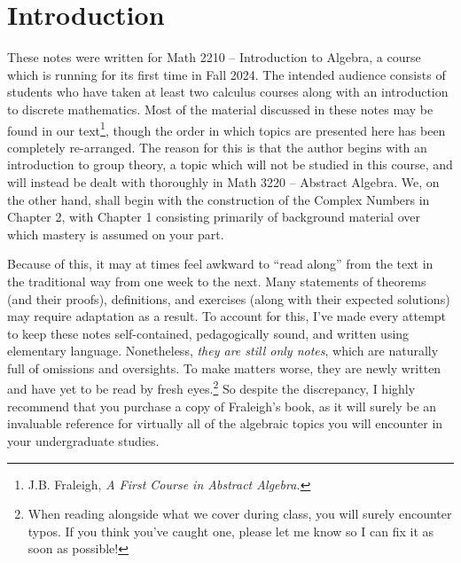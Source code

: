 \documentclass[11pt,fleqn,dvipsnames,usenames]{article}
\renewcommand{\headrulewidth}{1pt}
\newcommand{\p}{\noindent}
\begin{document}
\fancyhead[R]{\term}
\renewcommand{\headrulewidth}{0.4pt}


\setcounter{section}{0}

\section*{Introduction}

\p These notes were written for Math 2210 -- Introduction to Algebra, a course which is running for its first time in Fall 2024.  The intended audience consists of students who have taken at least two calculus courses along with an introduction to discrete mathematics.  Most of the material discussed in these notes may be found in our text\footnote{J.B. Fraleigh, \emph{A First Course in Abstract Algebra.}}, though the order in which topics are presented here has been completely re-arranged.  The reason for this is that the author begins with an introduction to group theory, a topic which will not be studied in this course, and will instead be dealt with thoroughly in Math 3220 -- Abstract Algebra.  We, on the other hand, shall begin with the construction of the Complex Numbers in Chapter 2, with Chapter 1 consisting primarily of background material over which mastery is assumed on your part.
\vsp

\p Because of this, it may at times feel awkward to ``read along'' from the text in the traditional way from one week to the next.  Many statements of theorems (and their proofs), definitions, and exercises (along with their expected solutions) may require adaptation as a result.  To account for this, I've made every attempt to keep these notes self-contained, pedagogically sound, and written using elementary language.  Nonetheless, \emph{they are still only notes}, which are naturally full of omissions and oversights.  To make matters worse, they are newly written and have yet to be read by fresh eyes.\footnote{When reading alongside what we cover during class, you will surely encounter typos.  If you think you've caught one, please let me know so I can fix it as soon as possible!}  So despite the discrepancy, I highly recommend that you purchase a copy of Fraleigh's book, as it will surely be an invaluable reference for virtually all of the algebraic topics you will encounter in your undergraduate studies.
\vsp
\end{document}
